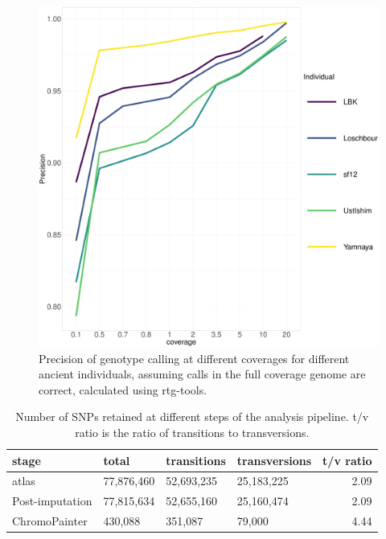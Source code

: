 {\begin{figure}[htp]
    \centering
    \includegraphics[width=1.0\textwidth]{../images/chapter1/allDownsampled_rtgtools_Precision.pdf}
    \caption{Precision of genotype calling at different coverages for different ancient individuals, assuming calls in the full coverage genome are correct,  calculated using rtg-tools.}
    \label{fig:precision_downsampled_rtgtools}
\end{figure}



\begin{table}
\centering
\begin{tabular}[t]{llllr}
\toprule
stage & total & transitions & transversions & t/v ratio\\
\midrule
atlas & 77,876,460 & 52,693,235 & 25,183,225 & 2.09\\
Post-imputation & 77,815,634 & 52,655,160 & 25,160,474 & 2.09\\
ChromoPainter & 430,088 & 351,087 & 79,000 & 4.44\\
\bottomrule
\end{tabular}
\caption{Number of SNPs retained at different steps of the analysis pipeline. t/v ratio is the ratio of transitions to transversions.}
\end{table}

\begingroup\fontsize{8}{10}\selectfont

}
